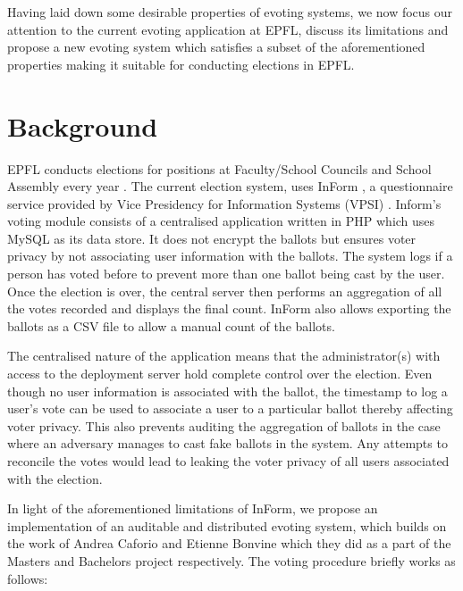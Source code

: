 Having laid down some desirable properties of evoting systems, we now focus our attention to the current evoting application at EPFL, discuss its limitations and propose a new evoting system which satisfies a subset of the aforementioned properties making it suitable for conducting elections in EPFL.

\section {Background}

EPFL conducts elections for positions at Faculty/School Councils and School Assembly every year \cite{assemblyEPFL}. The current election system, uses InForm \cite{inform}, a questionnaire service provided by Vice Presidency for Information Systems (VPSI) \cite{vpsi}. Inform's voting module consists of a centralised application written in PHP which uses MySQL as its data store. It does not encrypt the ballots but ensures voter privacy by not associating user information with the ballots. The system logs if a person has voted before to prevent more than one ballot being cast by the user. Once the election is over, the central server then performs an aggregation of all the votes recorded and displays the final count. InForm also allows exporting the ballots as a CSV file to allow a manual count of the ballots.

The centralised nature of the application means that the administrator(s) with access to the deployment server hold complete control over the election. Even though no user information is associated with the ballot, the timestamp to log a user's vote can be used to associate a user to a particular ballot thereby affecting voter privacy. This also prevents auditing the aggregation of ballots in the case where an adversary manages to cast fake ballots in the system. Any attempts to reconcile the votes would lead to leaking the voter privacy of all users associated with the election.

In light of the aforementioned limitations of InForm, we propose an implementation of an auditable and distributed evoting system, which builds on the work of Andrea Caforio \cite{andrea} and Etienne Bonvine \cite{etienne} which they did as a part of the Masters and Bachelors project respectively. The voting procedure briefly works as follows:

